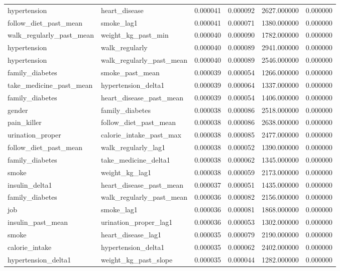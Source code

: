 \begin{longtable}{llrrrr}
hypertension & heart\_disease & 0.000041 & 0.000092 & 2627.000000 & 0.000000 \\
follow\_diet\_past\_mean & smoke\_lag1 & 0.000041 & 0.000071 & 1380.000000 & 0.000000 \\
walk\_regularly\_past\_mean & weight\_kg\_past\_min & 0.000040 & 0.000090 & 1782.000000 & 0.000000 \\
hypertension & walk\_regularly & 0.000040 & 0.000089 & 2941.000000 & 0.000000 \\
hypertension & walk\_regularly\_past\_mean & 0.000040 & 0.000089 & 2546.000000 & 0.000000 \\
family\_diabetes & smoke\_past\_mean & 0.000039 & 0.000054 & 1266.000000 & 0.000000 \\
take\_medicine\_past\_mean & hypertension\_delta1 & 0.000039 & 0.000064 & 1337.000000 & 0.000000 \\
family\_diabetes & heart\_disease\_past\_mean & 0.000039 & 0.000054 & 1406.000000 & 0.000000 \\
gender & family\_diabetes & 0.000038 & 0.000086 & 2518.000000 & 0.000000 \\
pain\_killer & follow\_diet\_past\_mean & 0.000038 & 0.000086 & 2638.000000 & 0.000000 \\
urination\_proper & calorie\_intake\_past\_max & 0.000038 & 0.000085 & 2477.000000 & 0.000000 \\
follow\_diet\_past\_mean & walk\_regularly\_lag1 & 0.000038 & 0.000052 & 1390.000000 & 0.000000 \\
family\_diabetes & take\_medicine\_delta1 & 0.000038 & 0.000062 & 1345.000000 & 0.000000 \\
smoke & weight\_kg\_lag1 & 0.000038 & 0.000059 & 2173.000000 & 0.000000 \\
insulin\_delta1 & heart\_disease\_past\_mean & 0.000037 & 0.000051 & 1435.000000 & 0.000000 \\
family\_diabetes & walk\_regularly\_past\_mean & 0.000036 & 0.000082 & 2156.000000 & 0.000000 \\
job & smoke\_lag1 & 0.000036 & 0.000081 & 1868.000000 & 0.000000 \\
insulin\_past\_mean & urination\_proper\_lag1 & 0.000036 & 0.000053 & 1302.000000 & 0.000000 \\
smoke & heart\_disease\_lag1 & 0.000035 & 0.000079 & 2190.000000 & 0.000000 \\
calorie\_intake & hypertension\_delta1 & 0.000035 & 0.000062 & 2402.000000 & 0.000000 \\
hypertension\_delta1 & weight\_kg\_past\_slope & 0.000035 & 0.000044 & 1282.000000 & 0.000000 \\

\end{longtable}
